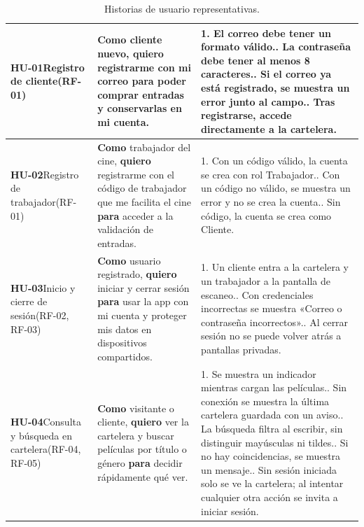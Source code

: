 \documentclass[11pt,a4paper]{article}
\begin{document}
\begin{longtable}{L{2.4cm} L{6.4cm} L{4.9cm}}
\caption{Historias de usuario representativas.}\\
\toprule
\endfirsthead
\toprule
\endhead
\endfoot
\bottomrule
\endlastfoot
\textbf{HU-01}\newline Registro de cliente\newline\small(RF-01) & \textbf{Como} cliente nuevo, \textbf{quiero} registrarme con mi correo \textbf{para} poder comprar entradas y conservarlas en mi cuenta. & 1. El correo debe tener un formato válido.. La contraseña debe tener al menos 8 caracteres.. Si el correo ya está registrado, se muestra un error junto al campo.. Tras registrarse, accede directamente a la cartelera. \\
\midrule
\textbf{HU-02}\newline Registro de trabajador\newline\small(RF-01) & \textbf{Como} trabajador del cine, \textbf{quiero} registrarme con el código de trabajador que me facilita el cine \textbf{para} acceder a la validación de entradas. & 1. Con un código válido, la cuenta se crea con rol Trabajador.. Con un código no válido, se muestra un error y no se crea la cuenta.. Sin código, la cuenta se crea como Cliente. \\
\midrule
\textbf{HU-03}\newline Inicio y cierre de sesión\newline\small(RF-02, RF-03) & \textbf{Como} usuario registrado, \textbf{quiero} iniciar y cerrar sesión \textbf{para} usar la app con mi cuenta y proteger mis datos en dispositivos compartidos. & 1. Un cliente entra a la cartelera y un trabajador a la pantalla de escaneo.. Con credenciales incorrectas se muestra «Correo o contraseña incorrectos».. Al cerrar sesión no se puede volver atrás a pantallas privadas. \\
\midrule
\textbf{HU-04}\newline Consulta y búsqueda en cartelera\newline\small(RF-04, RF-05) & \textbf{Como} visitante o cliente, \textbf{quiero} ver la cartelera y buscar películas por título o género \textbf{para} decidir rápidamente qué ver. & 1. Se muestra un indicador mientras cargan las películas.. Sin conexión se muestra la última cartelera guardada con un aviso.. La búsqueda filtra al escribir, sin distinguir mayúsculas ni tildes.. Si no hay coincidencias, se muestra un mensaje.. Sin sesión iniciada solo se ve la cartelera; al intentar cualquier otra acción se invita a iniciar sesión. \\

\end{longtable}
\end{document}
